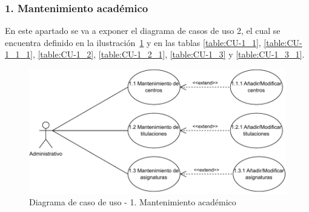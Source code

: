 \subsubsection{1. Mantenimiento académico}

En este apartado se va a exponer el diagrama de casos de uso 2, el cual se encuentra definido en la ilustración~\ref{fig:CU-1} y en las tablas \ref{table:CU-1_1}, \ref{table:CU-1_1_1}, \ref{table:CU-1_2}, \ref{table:CU-1_2_1}, \ref{table:CU-1_3} y \ref{table:CU-1_3_1}.

\begin{figure}[!h]
	\centering
	\includegraphics[scale=0.85]{../img/Anexos/Casos uso/Diagrama casos de uso 2.pdf}
	\caption{Diagrama de caso de uso - 1. Mantenimiento académico}\label{fig:CU-1}
\end{figure}
\FloatBarrier

